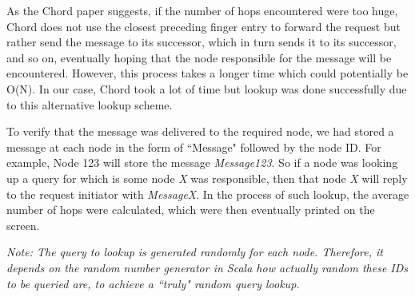 \documentclass[11pt]{article}
\begin{document}
As the Chord paper suggests, if the number of hops encountered were too huge, Chord does not use the closest preceding finger entry to forward the request but rather send the message to its successor, which in turn sends it to its successor, and so on, eventually hoping that the node responsible for the message will be encountered. However, this process takes a longer time which could potentially be O(N). In our case, Chord took a lot of time but lookup was done successfully due to this alternative lookup scheme.

To verify that the message was delivered to the required node, we had stored a message at each node in the form of ``Message" followed by the node ID. For example, Node 123 will store the message \textit{Message123}. So if a node was looking up a query for which is some node {\it X} was responsible, then that node {\it X} will reply to the request initiator with \textit{MessageX}. In the process of such lookup, the average number of hops were calculated, which were then eventually printed on the screen.

{\it Note: The query to lookup is generated randomly for each node. Therefore, it depends on the random number generator in Scala how actually random these IDs to be queried are, to achieve a ``truly" random query lookup.}
\end{document}
